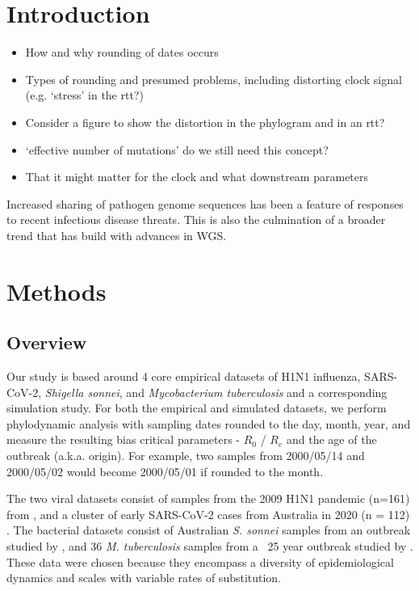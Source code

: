 \documentclass{article}
\begin{document}
\begin{spacing}{1.5}
\section*{Introduction}
\begin{itemize}
    \item How and why rounding of dates occurs
    \item Types of rounding and presumed problems, including distorting clock signal (e.g. `stress' in the rtt?)
    \item Consider a figure to show the distortion in the phylogram and in an rtt?
    \item `effective number of mutations' do we still need this concept?
    \item That it might matter for the clock and what downstream parameters
\end{itemize}

Increased sharing of pathogen genome sequences has been a feature of responses to recent infectious disease threats. This is also the culmination of a broader trend that has build with advances in WGS. 

\section*{Methods}
\subsection*{Overview}
Our study is based around 4 core empirical datasets of H1N1 influenza, SARS-CoV-2, \textit{Shigella sonnei}, and \textit{Mycobacterium tuberculosis} and a corresponding simulation study. For both the empirical and simulated datasets, we perform phylodynamic analysis with sampling dates rounded to the day, month, year, and measure the resulting bias critical parameters - $R_0$ / $R_e$ and the age of the outbreak (a.k.a. origin). For example, two samples from 2000/05/14 and 2000/05/02 would become 2000/05/01 if rounded to the month.

The two viral datasets consist of samples from the 2009 H1N1 pandemic (n=161) from \citet{hedge_2013_real-time}, and a cluster of early SARS-CoV-2 cases from  Australia in 2020 (n = 112) \citep{lane2021genomics}. The bacterial datasets consist of Australian \textit{S. sonnei} samples from an outbreak studied by \citet{ingle_co-circulation_2019}, and 36 \textit{M. tuberculosis} samples from a ~25 year outbreak studied by \citet{kuhnert_tuberculosis_2018}. These data were chosen because they encompass a diversity of epidemiological dynamics and scales with variable rates of substitution.



\end{spacing}
\end{document}
